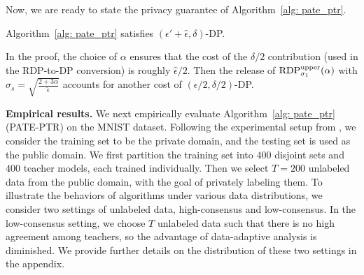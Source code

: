 Now, we are ready to state the privacy guarantee of Algorithm~\ref{alg: pate_ptr}.





\begin{theorem}\label{thm: pate_ptr}
Algorithm~\ref{alg: pate_ptr} satisfies $(\epsilon'+\hat{\epsilon}, \delta)$-DP.
\end{theorem}
In the proof, the choice of $\alpha$ ensures that the cost of the $\delta/2$ contribution (used in the RDP-to-DP conversion) is roughly $\hat{\epsilon}/2$. Then  the release of $\mathrm{RDP}_{\sigma_1}^{\text{upper}}(\alpha)$ with  $\sigma_s =\sqrt{\frac{2+3\alpha}{\hat{\epsilon}}}$ accounts for another cost of $(\epsilon/2, \delta/2)$-DP.%




\textbf{Empirical results.} We next empirically evaluate Algorithm~\ref{alg: pate_ptr} (PATE-PTR) on the MNIST dataset. Following the experimental setup from \citet{papernot2018scalable}, we consider the training set to be the private domain, and the testing set is used as the public domain.  We first partition the training set into $400$ disjoint sets and $400$ teacher models, each trained individually. Then we select $T=200$ unlabeled data from the public domain, with the goal of privately labeling them. 
To illustrate the behaviors of algorithms under various data distributions, we consider two settings of unlabeled data, high-consensus and low-consensus. In the low-consensus setting, we choose $T$ unlabeled data such that there is no high agreement among teachers, so the advantage of data-adaptive analysis is diminished. We provide further details on the distribution of these two settings in the appendix.

